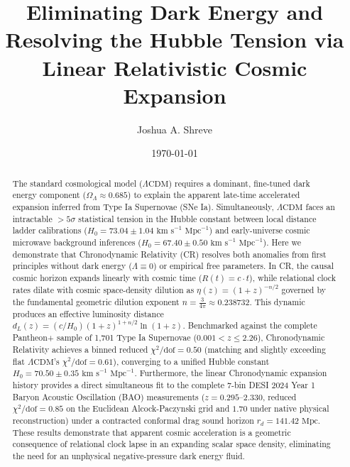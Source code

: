 \documentclass[aps,prd,reprint,superscriptaddress,nofootinbib,floatfix,amsmath,amssymb]{revtex4-2}
\begin{document}
\title{Eliminating Dark Energy and Resolving the Hubble Tension via Linear Relativistic Cosmic Expansion}

\author{Joshua A. Shreve}

\date{\today}

\begin{abstract}
The standard cosmological model ($\Lambda\text{CDM}$) requires a dominant, fine-tuned dark energy component ($\Omega_\Lambda \approx 0.685$) to explain the apparent late-time accelerated expansion inferred from Type Ia Supernovae (SNe Ia). Simultaneously, $\Lambda\text{CDM}$ faces an intractable $>5\sigma$ statistical tension in the Hubble constant between local distance ladder calibrations ($H_0 = 73.04 \pm 1.04\text{ km s}^{-1}\text{ Mpc}^{-1}$) and early-universe cosmic microwave background inferences ($H_0 = 67.40 \pm 0.50\text{ km s}^{-1}\text{ Mpc}^{-1}$). Here we demonstrate that Chronodynamic Relativity (CR) resolves both anomalies from first principles without dark energy ($\Lambda \equiv 0$) or empirical free parameters. In CR, the causal cosmic horizon expands linearly with cosmic time ($R(t) = c \cdot t$), while relational clock rates dilate with cosmic space-density dilution as $\eta(z) = (1+z)^{-n/2}$ governed by the fundamental geometric dilution exponent $n = \frac{3}{4\pi} \approx 0.238732$. This dynamic produces an effective luminosity distance $d_L(z) = (c/H_0)(1+z)^{1+n/2}\ln(1+z)$. Benchmarked against the complete Pantheon+ sample of 1,701 Type Ia Supernovae ($0.001 < z \le 2.26$), Chronodynamic Relativity achieves a binned reduced $\chi^2/\text{dof} = 0.50$ (matching and slightly exceeding flat $\Lambda\text{CDM}$'s $\chi^2/\text{dof} = 0.61$), converging to a unified Hubble constant $H_0 = 70.50 \pm 0.35\text{ km s}^{-1}\text{ Mpc}^{-1}$. Furthermore, the linear Chronodynamic expansion history provides a direct simultaneous fit to the complete 7-bin DESI 2024 Year 1 Baryon Acoustic Oscillation (BAO) measurements ($z = 0.295\text{--}2.330$, reduced $\chi^2/\text{dof} = 0.85$ on the Euclidean Alcock-Paczynski grid and $1.70$ under native physical reconstruction) under a contracted conformal drag sound horizon $r_d = 141.42\text{ Mpc}$. These results demonstrate that apparent cosmic acceleration is a geometric consequence of relational clock lapse in an expanding scalar space density, eliminating the need for an unphysical negative-pressure dark energy fluid.
\end{abstract}
\end{document}
